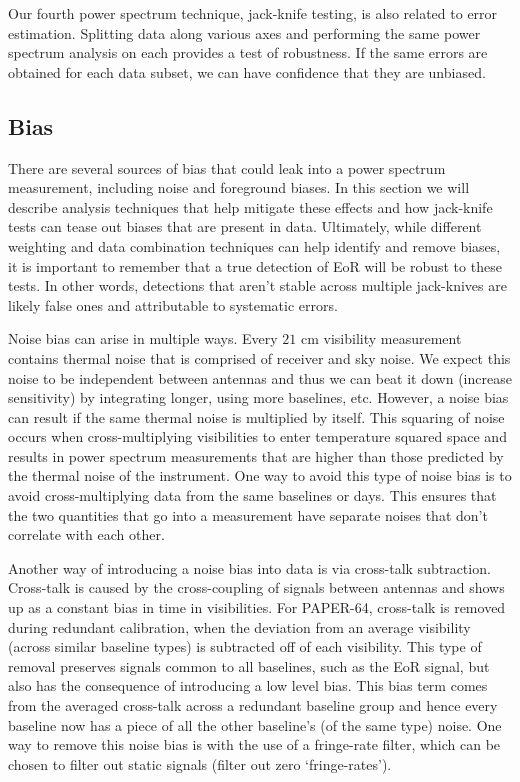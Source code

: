 \documentclass[preprint2,numberedappendix,tighten,twocolappendix]{aastex6}  %
\begin{document}
Our fourth power spectrum technique, jack-knife testing, is also related to error estimation. Splitting data along various axes and performing the same power spectrum analysis on each provides a test of robustness. If the same errors are obtained for each data subset, we can have confidence that they are unbiased.

\subsection{Bias}
\label{sec:BiasOverview}

There are several sources of bias that could leak into a power spectrum measurement, including noise and foreground biases. In this section we will describe analysis techniques that help mitigate these effects and how jack-knife tests can tease out biases that are present in data. Ultimately, while different weighting and data combination techniques can help identify and remove biases, it is important to remember that a true detection of EoR will be robust to these tests. In other words, detections that aren't stable across multiple jack-knives are likely false ones and attributable to systematic errors.

Noise bias can arise in multiple ways. Every $21$ cm visibility measurement contains thermal noise that is comprised of receiver and sky noise. We expect this noise to be independent between antennas and thus we can beat it down (increase sensitivity) by integrating longer, using more baselines, etc. However, a noise bias can result if the same thermal noise is multiplied by itself. This squaring of noise occurs when cross-multiplying visibilities to enter temperature squared space and results in power spectrum measurements that are higher than those predicted by the thermal noise of the instrument. One way to avoid this type of noise bias is to avoid cross-multiplying data from the same baselines or days. This ensures that the two quantities that go into a measurement have separate noises that don't correlate with each other. 

Another way of introducing a noise bias into data is via cross-talk subtraction. Cross-talk is caused by the cross-coupling of signals between antennas and shows up as a constant bias in time in visibilities. For PAPER-64, cross-talk is removed during redundant calibration, when the deviation from an average visibility (across similar baseline types) is subtracted off of each visibility. This type of removal preserves signals common to all baselines, such as the EoR signal, but also has the consequence of introducing a low level bias. This bias term comes from the averaged cross-talk across a redundant baseline group and hence every baseline now has a piece of all the other baseline's (of the same type) noise. One way to remove this noise bias is with the use of a fringe-rate filter, which can be chosen to filter out static signals (filter out zero `fringe-rates').
\end{document}
